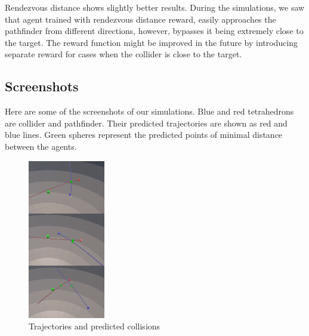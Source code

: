 Rendezvous distance shows slightly better results.
During the simulations, we saw that agent trained with rendezvous distance reward, easily approaches the pathfinder from different directions, however, bypasses it being extremely close to the target.
The reward function might be improved in the future by introducing separate reward for cases when the collider is close to the target.

\subsection{Screenshots}
Here are some of the screenshots of our simulations.
Blue and red tetrahedrons are collider and pathfinder.
Their predicted trajectories are shown as red and blue lines.
Green spheres represent the predicted points of minimal distance between the agents.

\begin{figure}[H]
	\centering
	\includegraphics[width=0.3\textwidth]{images/AAA.png}
	\caption{Trajectories and predicted collisions}
	\label{fig:}
\end{figure}